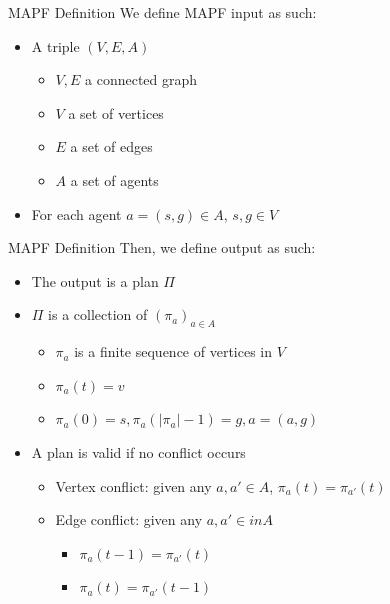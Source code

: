 \begin{frame}{MAPF Definition}
    We define MAPF\cite{husvobbass22a} input as such:
        \begin{itemize}
            \item A triple $(V,E,A)$
            \begin{itemize}
                \item $V,E$ a connected graph
                \item $V$ a set of vertices
                \item $E$ a set of edges
                \item $A$ a set of agents
            \end{itemize}
            \item For each agent \(a=(s,g) \in A\), \(s,g \in V\)
        \end{itemize}
\end{frame}


\begin{frame}{MAPF Definition}
    Then, we define output as such:
        \begin{itemize}
            \item The output is a plan \(\Pi\)
            \item \(\Pi\) is a collection of $(\pi_a)_{a\in A}$
            \begin{itemize}
                \item \(\pi_a\) is a finite sequence of vertices in $V$ 
                \item \(\pi_a (t) = v\) 
                \item \(\pi_a(0) = s, \pi_a(|\pi_a|-1) = g, a = (a,g)\)
            \end{itemize}
            \item A plan is valid if no conflict occurs
            \begin{itemize}
                \item Vertex conflict: given any $a,a'\in A$, $\pi_a(t) = \pi_{a'}(t)$
                \item Edge conflict: given any $a,a'\in in A$
                \begin{itemize}
                    \item $\pi_a(t-1) = \pi_{a'}(t)$
                    \item $\pi_a(t) = \pi_{a'}(t-1)$
                \end{itemize}
            \end{itemize}
        \end{itemize}
\end{frame}



